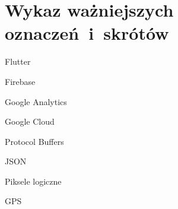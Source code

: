 \chapter*{Wykaz ważniejszych oznaczeń~i~skrótów}

\begin{description}
	\item Flutter
	\item Firebase
	\item Google Analytics
	\item Google Cloud
	\item Protocol Buffers
	\item JSON
	\item Piksele logiczne
	\item GPS
\end{description}
